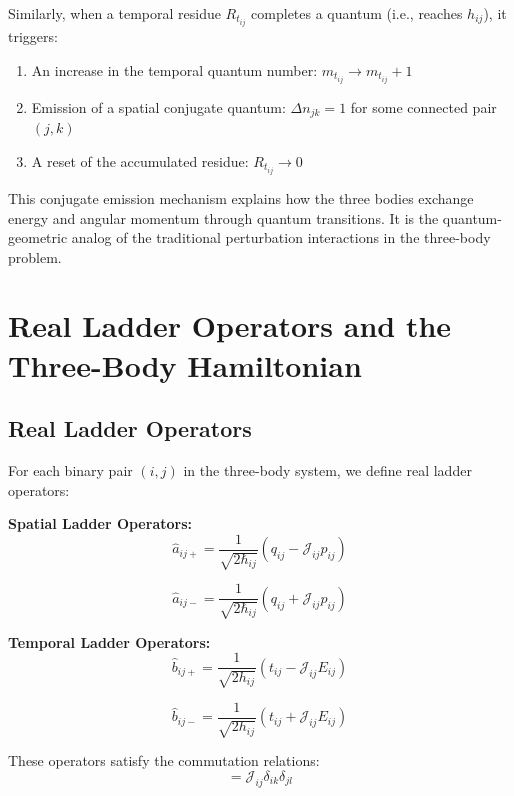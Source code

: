 \documentclass{article}
\begin{document}
Similarly, when a temporal residue $R_{t_{ij}}$ completes a quantum (i.e., reaches $h_{ij}$), it triggers:
\begin{enumerate}
\item An increase in the temporal quantum number: $m_{t_{ij}} \rightarrow m_{t_{ij}} + 1$
\item Emission of a spatial conjugate quantum: $\Delta n_{jk} = 1$ for some connected pair $(j,k)$
\item A reset of the accumulated residue: $R_{t_{ij}} \rightarrow 0$
\end{enumerate}

This conjugate emission mechanism explains how the three bodies exchange energy and angular momentum through quantum transitions. It is the quantum-geometric analog of the traditional perturbation interactions in the three-body problem.

\section{Real Ladder Operators and the Three-Body Hamiltonian}

\subsection{Real Ladder Operators}

For each binary pair $(i,j)$ in the three-body system, we define real ladder operators:

\textbf{Spatial Ladder Operators:}
\begin{equation}
\hat{a}_{ij+} = \frac{1}{\sqrt{2\hbar_{ij}}}(q_{ij} - \mathcal{J}_{ij} p_{ij})
\end{equation}

\begin{equation}
\hat{a}_{ij-} = \frac{1}{\sqrt{2\hbar_{ij}}}(q_{ij} + \mathcal{J}_{ij} p_{ij})
\end{equation}

\textbf{Temporal Ladder Operators:}
\begin{equation}
\hat{b}_{ij+} = \frac{1}{\sqrt{2h_{ij}}}(t_{ij} - \mathcal{J}_{ij} E_{ij})
\end{equation}

\begin{equation}
\hat{b}_{ij-} = \frac{1}{\sqrt{2h_{ij}}}(t_{ij} + \mathcal{J}_{ij} E_{ij})
\end{equation}

These operators satisfy the commutation relations:
\begin{equation}
[\hat{a}_{ij+}, \hat{a}_{kl-}] = \mathcal{J}_{ij} \delta_{ik}\delta_{jl}
\end{equation}
\end{document}
